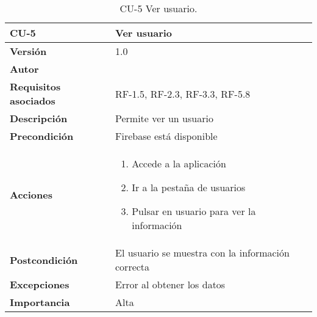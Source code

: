 \begin{table}[p]
	\centering
	\begin{tabularx}{\linewidth}{ p{} p{} }
		\toprule
		\textbf{CU-5}    & \textbf{Ver usuario}\\
		\toprule
		\textbf{Versión}              & 1.0    \\
		\textbf{Autor}                & {\nombre} \\
		\textbf{Requisitos asociados} & RF-1.5, RF-2.3, RF-3.3, RF-5.8 \\
		\textbf{Descripción}          & Permite ver un usuario \\
		\textbf{Precondición}         & Firebase está disponible \\
		\textbf{Acciones}             &
		\begin{enumerate}
			\def\labelenumi{\arabic{enumi}.}
			\tightlist
			\item Accede a la aplicación
			\item Ir a la pestaña de usuarios
			\item Pulsar en usuario para ver la información
		\end{enumerate}\\
		\textbf{Postcondición}        & El usuario se muestra con la información correcta \\
		\textbf{Excepciones}          & Error al obtener los datos\\
		\textbf{Importancia}          & Alta \\
		\bottomrule
	\end{tabularx}
	\caption{CU-5 Ver usuario.}
\end{table}

